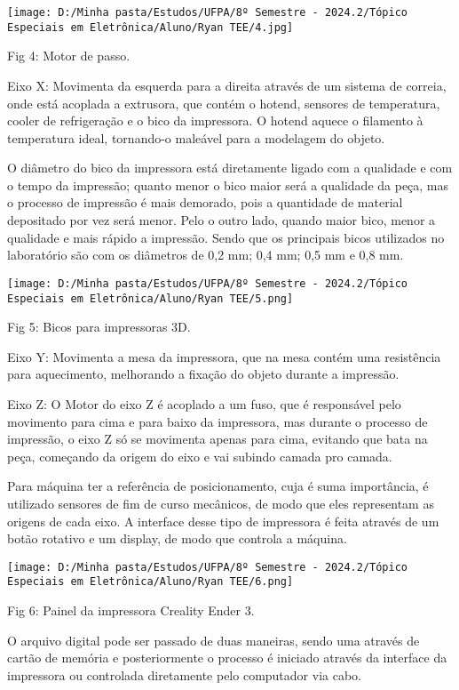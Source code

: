 \documentclass[
]{book}
\begin{document}
\texttt{[image: D:/Minha pasta/Estudos/UFPA/8º Semestre - 2024.2/Tópico Especiais em Eletrônica/Aluno/Ryan TEE/4.jpg]}

Fig 4: Motor de passo.

Eixo X: Movimenta da esquerda para a direita através de um sistema de correia, onde está acoplada a extrusora, que contém o hotend, sensores de temperatura, cooler de refrigeração e o bico da impressora. O hotend aquece o filamento à temperatura ideal, tornando-o maleável para a modelagem do objeto.

O diâmetro do bico da impressora está diretamente ligado com a qualidade e com o tempo da impressão; quanto menor o bico maior será a qualidade da peça, mas o processo de impressão é mais demorado, pois a quantidade de material depositado por vez será menor. Pelo o outro lado, quando maior bico, menor a qualidade e mais rápido a impressão. Sendo que os principais bicos utilizados no laboratório são com os diâmetros de 0,2 mm; 0,4 mm; 0,5 mm e 0,8 mm.

\texttt{[image: D:/Minha pasta/Estudos/UFPA/8º Semestre - 2024.2/Tópico Especiais em Eletrônica/Aluno/Ryan TEE/5.png]}

Fig 5: Bicos para impressoras 3D.

Eixo Y: Movimenta a mesa da impressora, que na mesa contém uma resistência para aquecimento, melhorando a fixação do objeto durante a impressão.

Eixo Z: O Motor do eixo Z é acoplado a um fuso, que é responsável pelo movimento para cima e para baixo da impressora, mas durante o processo de impressão, o eixo Z só se movimenta apenas para cima, evitando que bata na peça, começando da origem do eixo e vai subindo camada pro camada.

Para máquina ter a referência de posicionamento, cuja é suma importância, é utilizado sensores de fim de curso mecânicos, de modo que eles representam as origens de cada eixo. A interface desse tipo de impressora é feita através de um botão rotativo e um display, de modo que controla a máquina.

\texttt{[image: D:/Minha pasta/Estudos/UFPA/8º Semestre - 2024.2/Tópico Especiais em Eletrônica/Aluno/Ryan TEE/6.png]}

Fig 6: Painel da impressora Creality Ender 3.

O arquivo digital pode ser passado de duas maneiras, sendo uma através de cartão de memória e posteriormente o processo é iniciado através da interface da impressora ou controlada diretamente pelo computador via cabo.
\end{document}

